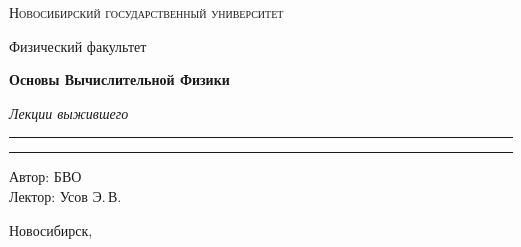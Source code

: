 \documentclass[12pt,a4paper]{report}
\begin{document}
\begin{titlepage}
    \thispagestyle{empty}

    \begin{center}
        \vspace*{1.5cm}

        {\Large\scshape Новосибирский государственный университет\par}
        \vspace{0.25cm}
        {\large Физический факультет\par}

        \vfill

        {\Huge\bfseries Основы Вычислительной Физики\par}

        \vspace{0.45cm}

        {\Large\itshape Лекции выжившего\par}

        \vspace{0.8cm}

        \rule{0.72\linewidth}{0 pt}



        \rule{2\linewidth}{0pt}

        \vfill

        \begin{flushright}
            \large
            Автор: БВО\\[0.25cm]
            Лектор: Усов Э.\,В.
        \end{flushright}

        \vspace{1.2cm}

        {\large Новосибирск, \the\year}

    \end{center}
\end{titlepage}

\tableofcontents
\newpage



\clearpage

\clearpage

\clearpage
\end{document}
